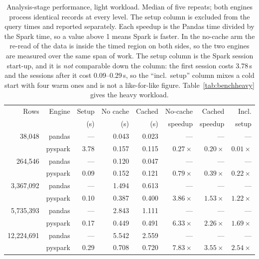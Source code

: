 \documentclass[sigconf,balance=false]{acmart}
\begin{document}
\begin{table}[t]
\caption{Analysis-stage performance, light workload. Median of five repeats;
         both engines process identical records at every level. The setup
         column is excluded from the query times and reported separately.
         Each speedup is the Pandas time divided by the Spark time, so a
         value above 1 means Spark is faster. In the no-cache arm the
         re-read of the data is inside the timed region on both sides, so
         the two engines are measured over the same span of work. The
         setup column is the Spark session start-up, and it is
         \emph{not} comparable down the column: the first session costs
         3.78\,s and the sessions after it cost 0.09--0.29\,s, so the
         ``incl.\ setup'' column mixes a cold start with four warm ones
         and is not a like-for-like figure. Table~\ref{tab:benchheavy}
         gives the heavy workload.}
\label{tab:bench}
\centering
\scriptsize
\setlength{\tabcolsep}{2.5pt}
\begin{tabular}{@{}rrrrrrrr@{}}
\toprule
Rows & Engine & Setup & No cache & Cached & No-cache & Cached & Incl. \\
     &        & (s)   & (s)      & (s)    & speedup  & speedup & setup \\
\midrule
38{,}048     & pandas  & ---   & 0.043 & 0.023 & ---   & ---   & --- \\
             & pyspark & 3.78 & 0.157 & 0.115 & $0.27\times$ & $0.20\times$ & $0.01\times$ \\
264{,}546    & pandas  & ---   & 0.120 & 0.047 & ---   & ---   & --- \\
             & pyspark & 0.09 & 0.152 & 0.121 & $0.79\times$ & $0.39\times$ & $0.22\times$ \\
\midrule
3{,}367{,}092 & pandas  & ---   & 1.494 & 0.613 & ---   & ---   & --- \\
             & pyspark & 0.10 & 0.387 & 0.400 & $3.86\times$ & $1.53\times$ & $1.22\times$ \\
5{,}735{,}393 & pandas  & ---   & 2.843 & 1.111 & ---   & ---   & --- \\
             & pyspark & 0.17 & 0.449 & 0.491 & $6.33\times$ & $2.26\times$ & $1.69\times$ \\
\midrule
12{,}224{,}691 & pandas  & ---   & 5.542 & 2.559 & ---   & ---   & --- \\
             & pyspark & 0.29 & 0.708 & 0.720 & $7.83\times$ & $3.55\times$ & $2.54\times$ \\
\bottomrule
\end{tabular}
\end{table}
\end{document}

